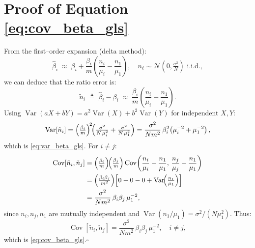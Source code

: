 \documentclass[journal]{IEEEtran}
\begin{document}
\section{Proof of Equation \eqref{eq:cov_beta_gls}}
\label{app:cov_beta_gls}
From the first–order expansion (delta method):
\begin{equation}
\hat{\beta}_i \;\approx\; \beta_i
+ \frac{\beta_i}{m}\!\left(\frac{n_i}{\mu_i} - \frac{n_1}{\mu_1}\right),
\quad
n_\ell \sim \mathcal{N}\!\left(0,\tfrac{\sigma^2}{N}\right) \text{ i.i.d.},
\end{equation}
we can deduce that the ratio error is:
\begin{equation}
\tilde{n}_i \;\triangleq\; \hat{\beta}_i-\beta_i
\;\approx\; \frac{\beta_i}{m}\!\left(\frac{n_i}{\mu_i} - \frac{n_1}{\mu_1}\right).
\label{eq:tilden_i}
\end{equation}
Using $\operatorname{Var}(aX+bY)=a^2\operatorname{Var}(X)+b^2\operatorname{Var}(Y)$ for independent $X,Y$:
\begin{equation}
\operatorname{Var}[\tilde n_i]
=\Bigl(\tfrac{\beta_i}{m}\Bigr)^{\!2}\!
\Bigl(\tfrac{\sigma^2}{N\,\mu_i^{2}}+\tfrac{\sigma^2}{N\,\mu_1^{2}}\Bigr)
=\frac{\sigma^{2}}{N m^{2}}\,
\beta_i^{2}\!\left(\mu_i^{-2}+\mu_1^{-2}\right),
\label{eq:var_beta_gls_proof}
\end{equation}
which is \eqref{eq:var_beta_gls}. For $i\neq j$:
\begin{align}
\operatorname{Cov}[\tilde n_i,\tilde n_j]
&=\Bigl(\tfrac{\beta_i}{m}\Bigr)\!\Bigl(\tfrac{\beta_j}{m}\Bigr)
\operatorname{Cov}\!\left(\frac{n_i}{\mu_i}-\frac{n_1}{\mu_1},\,
                           \frac{n_j}{\mu_j}-\frac{n_1}{\mu_1}\right)\notag\\
&=\Bigl(\tfrac{\beta_i\beta_j}{m^2}\Bigr)\!
\left[0-0-0+\operatorname{Var}\!\Bigl(\tfrac{n_1}{\mu_1}\Bigr)\right]\notag\\
&=\frac{\sigma^{2}}{N m^{2}}\,
\beta_i\beta_j\,\mu_1^{-2},
\label{eq:cov_beta_gls_proof}
\end{align}
since $n_i,n_j,n_1$ are mutually independent and
$\operatorname{Var}(n_1/\mu_1)=\sigma^2/(N\mu_1^2)$.
Thus:
\begin{equation}
\operatorname{Cov}[\tilde{n}_i,\tilde{n}_j]
=
\frac{\sigma^{2}}{N m^{2}}\,
\beta_i\beta_j\,\mu_1^{-2}, \quad i\neq j,
\end{equation}
which is \eqref{eq:cov_beta_gls}.\hfill\(\square\)





\end{document}
